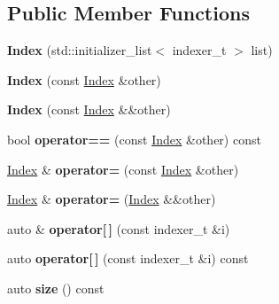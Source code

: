\subsection*{Public Member Functions}
\begin{DoxyCompactItemize}
\item 
\mbox{\label{structmgs_1_1Index_a8ef83a7a8f00efc4f25dfff14f0ef92b}} 
{\bfseries Index} (std\+::initializer\+\_\+list$<$ indexer\+\_\+t $>$ list)
\item 
\mbox{\label{structmgs_1_1Index_a778917404c58bff07205ba5ce03334a5}} 
{\bfseries Index} (const \hyperlink{structmgs_1_1Index}{Index} \&other)
\item 
\mbox{\label{structmgs_1_1Index_a851c30c3cc454ea6e973890e6ae068cc}} 
{\bfseries Index} (const \hyperlink{structmgs_1_1Index}{Index} \&\&other)
\item 
\mbox{\label{structmgs_1_1Index_a6fd3f08fd7b6df7564fdb061e8e2adf8}} 
bool {\bfseries operator==} (const \hyperlink{structmgs_1_1Index}{Index} \&other) const
\item 
\mbox{\label{structmgs_1_1Index_a983461a967e5e46e5475a2a5097a3ec1}} 
\hyperlink{structmgs_1_1Index}{Index} \& {\bfseries operator=} (const \hyperlink{structmgs_1_1Index}{Index} \&other)
\item 
\mbox{\label{structmgs_1_1Index_adb94c34260974b2c361968fc57746ec5}} 
\hyperlink{structmgs_1_1Index}{Index} \& {\bfseries operator=} (\hyperlink{structmgs_1_1Index}{Index} \&\&other)
\item 
\mbox{\label{structmgs_1_1Index_a7484ae21ad9bb1a3a452948029f138dc}} 
auto \& {\bfseries operator\mbox{[}$\,$\mbox{]}} (const indexer\+\_\+t \&i)
\item 
\mbox{\label{structmgs_1_1Index_a4c2790f9d281294fe162865fe30ab6ac}} 
auto {\bfseries operator\mbox{[}$\,$\mbox{]}} (const indexer\+\_\+t \&i) const
\item 
\mbox{\label{structmgs_1_1Index_a02ef73c597df9571817dc8c5f9020a44}} 
auto {\bfseries size} () const
\end{DoxyCompactItemize}
